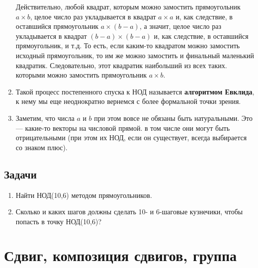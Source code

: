 \begin{enumerate}
Действительно, любой квадрат, которым можно замостить прямоугольник $a\times b$, целое число раз укладывается в квадрат $a\times a$ и, как следствие, в оставшийся прямоугольник $a\times(b-a)$, а значит, целое число раз укладывается в квадрат $(b-a)\times (b-a)$ и, как следствие, в оставшийся прямоугольник, и т.д. То есть, если каким-то квадратом можно замостить исходный прямоугольник, то им же можно замостить и финальный маленький квадратик. Следовательно, этот квадратик наибольший из всех таких. которыми можно замостить прямоугольник $a\times b$.
\item Такой процесс постепенного спуска к НОД называется \textbf{алгоритмом Евклида}, к нему мы еще неоднократно вернемся с более формальной точки зрения.
\item Заметим, что числа $a$ и $b$ при этом вовсе не обязаны быть натуральными. Это --- какие-то векторы на числовой прямой. в том числе они могут быть отрицательными (при этом их НОД, если он существует, всегда выбирается со знаком плюс).
\end{enumerate}
\subsection*{Задачи}
\begin{enumerate}
\item Найти НОД(10,6) методом прямоугольников.
\item Сколько и каких шагов должны сделать 10- и 6-шаговые кузнечики, чтобы попасть в точку НОД(10,6)?
\end{enumerate}

\section{Сдвиг, композиция сдвигов, группа}

